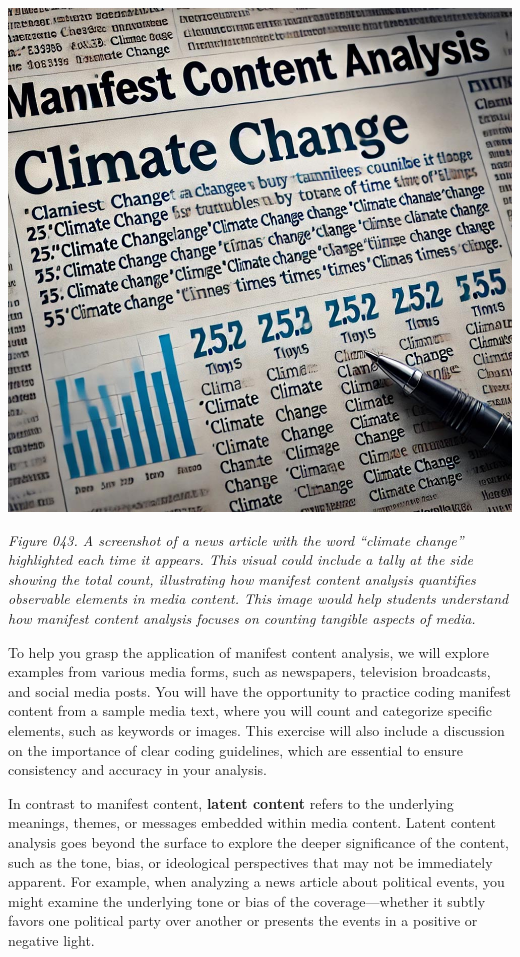 \documentclass[
]{book}
\begin{document}
\includegraphics[width=1\linewidth,height=\textheight,keepaspectratio]{images/fig043.jpg}

\emph{Figure 043. A screenshot of a news article with the word ``climate change'' highlighted each time it appears. This visual could include a tally at the side showing the total count, illustrating how manifest content analysis quantifies observable elements in media content. This image would help students understand how manifest content analysis focuses on counting tangible aspects of media.}

To help you grasp the application of manifest content analysis, we will explore examples from various media forms, such as newspapers, television broadcasts, and social media posts. You will have the opportunity to practice coding manifest content from a sample media text, where you will count and categorize specific elements, such as keywords or images. This exercise will also include a discussion on the importance of clear coding guidelines, which are essential to ensure consistency and accuracy in your analysis.

In contrast to manifest content, \textbf{latent content} refers to the underlying meanings, themes, or messages embedded within media content. Latent content analysis goes beyond the surface to explore the deeper significance of the content, such as the tone, bias, or ideological perspectives that may not be immediately apparent. For example, when analyzing a news article about political events, you might examine the underlying tone or bias of the coverage---whether it subtly favors one political party over another or presents the events in a positive or negative light.
\end{document}
